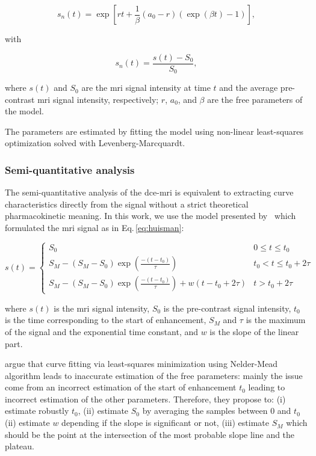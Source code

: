 \begin{equation}
  s_n(t) = \exp\left[rt + \frac{1}{\beta} \left( a_0 - r \right) \left( \exp(\beta t) - 1 \right) \right],
  \label{eq:pun}
\end{equation}

\noindent with

\begin{equation}
  s_n(t) = \frac{s(t) - S_0}{S_0},
  \label{eq:enh}
\end{equation}

\noindent where $s(t)$ and $S_0$ are the \ac{mri} signal intensity at time $t$ and the average pre-contrast \ac{mri} signal intensity, respectively; $r$, $a_0$, and $\beta$ are the free parameters of the model.

The parameters are estimated by fitting the model using non-linear least-squares optimization solved with Levenberg-Marcquardt.

\subsubsection{Semi-quantitative analysis}\label{sec:semi}

The semi-quantitative analysis of the \ac{dce}-\ac{mri} is equivalent to extracting curve characteristics directly from the signal without a strict theoretical pharmacokinetic meaning.
In this work, we use the model presented by~\cite{huisman2001accurate} which formulated the \ac{mri} signal as in Eq.\,\eqref{eq:huisman}:

\begin{equation}
  s(t) = \begin{cases}
    S_0 & 0 \leq t \leq t_0 \\
    S_M - (S_M - S_0) \exp\left( \frac{-(t - t_0)}{\tau} \right) & t_0 < t \leq t_0 + 2 \tau \\
    S_M - (S_M - S_0) \exp\left( \frac{-(t - t_0)}{\tau} \right) + w(t - t_0 + 2 \tau) & t > t_0 + 2 \tau
  \end{cases}
  \label{eq:huisman}
\end{equation}

\noindent where $s(t)$ is the \ac{mri} signal intensity, $S_0$ is the pre-contrast signal intensity, $t_0$ is the time corresponding to the start of enhancement, $S_M$ and $\tau$ is the maximum of the signal and the exponential time constant, and $w$ is the slope of the linear part.

\citeauthor{huisman2001accurate} argue that curve fitting via least-squares minimization using Nelder-Mead algorithm leads to inaccurate estimation of the free parameters: mainly the issue come from an incorrect estimation of the start of enhancement $t_0$ leading to incorrect estimation of the other parameters.
Therefore, they propose to:
(i) estimate robustly $t_0$,
(ii) estimate $S_0$ by averaging the samples between $0$ and $t_0$
(ii) estimate $w$ depending if the slope is significant or not,
(iii) estimate $S_M$ which should be the point at the intersection of the most probable slope line and the plateau.

